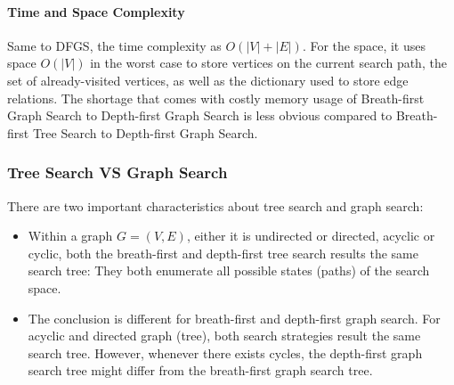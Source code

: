 \documentclass[../main.tex]{subfiles}
\begin{document}
\paragraph{Time and Space Complexity}  Same to DFGS, the time complexity as $O(|V|+|E|)$. For the space, it uses space $O(|V|)$ in the worst case to
store vertices on the current search path, the set of
already-visited vertices, as well as the dictionary used to store edge relations. The shortage that comes with costly memory usage of Breath-first Graph Search to Depth-first Graph Search is less obvious compared to Breath-first Tree Search to Depth-first Graph Search. 

\subsubsection{Tree Search VS Graph Search}
There are two important characteristics about tree search and graph search:
\begin{itemize}
    \item Within a graph $G=(V, E)$, either it is undirected or directed, acyclic or cyclic, both the breath-first and depth-first tree search results the same search tree: They both enumerate all possible states (paths) of the search space.
    \item The conclusion is different for breath-first and depth-first graph search. For acyclic and directed graph (tree), both search strategies result the same search tree. However, whenever there exists cycles, the depth-first graph search tree might differ from the breath-first graph search tree. 
\end{itemize}

\end{document}
